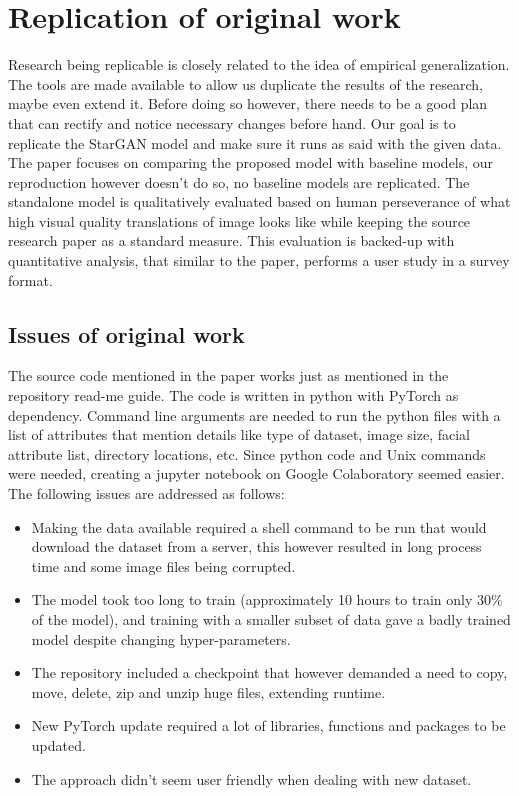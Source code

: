 \documentclass[preprint,12pt]{elsarticle}
\begin{document}
\section{Replication of original work}
\label{S:3}

Research being replicable is closely related to the idea of empirical generalization. The tools are made available to allow us duplicate the results of the research, maybe even extend it. Before doing so however, there needs to be a good plan that can rectify and notice necessary changes before hand. Our goal is to replicate the StarGAN model and make sure it runs as said with the given data. The paper focuses on comparing the proposed model with baseline models, our reproduction however doesn't do so, no baseline models are replicated. The standalone model is qualitatively evaluated based on human perseverance of what high visual quality translations of image looks like while keeping the source research paper as a standard measure. This evaluation is backed-up with quantitative analysis, that similar to the paper, performs a user study in a survey format.

\subsection{Issues of original work}

The source code mentioned in the paper works just as mentioned in the repository read-me guide. The code is written in python with PyTorch as dependency. Command line arguments are needed to run the python files with a list of attributes that mention details like type of dataset, image size, facial attribute list, directory locations, etc. Since python code and Unix commands were needed, creating a jupyter notebook on Google Colaboratory seemed easier. The following issues are addressed as follows:

\begin{itemize}
\item Making the data available required a shell command to be run that would download the dataset from a server, this however resulted in long process time and some image files being corrupted. 
\item The model took too long to train (approximately 10 hours to train only 30\% of the model), and training with a smaller subset of data gave a badly trained model despite changing hyper-parameters.
\item The repository included a checkpoint that however demanded a need to copy, move, delete, zip and unzip huge files, extending runtime. 
\item New PyTorch update required a lot of libraries, functions and packages to be updated. 
\item The approach didn't seem user friendly when dealing with new dataset. 
\end{itemize}
\end{document}
